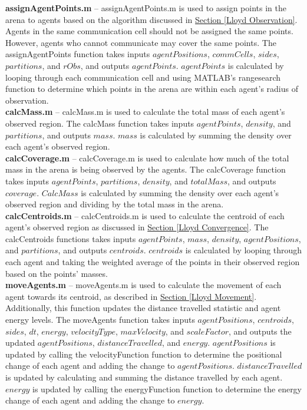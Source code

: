 \documentclass[../CourseManual.tex]{subfiles}
\begin{document}
\textbf{assignAgentPoints.m} -- assignAgentPoints.m is used to assign points in the arena to agents based on the algorithm discussed in \hyperref[Lloyd Observation]{Section \ref{Lloyd Observation}}. Agents in the same communication cell should not be assigned the same points. However, agents who cannot communicate may cover the same points. The assignAgentPoints function takes inputs  $agentPositions$, $commCells$, $sides$, $partitions$, and $rObs$, and outputs $agentPoints$. $agentPoints$ is calculated by looping through each communication cell and using MATLAB's rangesearch function to determine which points in the arena are within each agent's radius of observation. \\ 

\textbf{calcMass.m} -- calcMass.m is used to calculate the total mass of each agent's observed region. The calcMass function takes inputs $agentPoints$, $density$, and $partitions$, and outputs $mass$. $mass$ is calculated by summing the density over each agent's observed region. \\

\textbf{calcCoverage.m} -- calcCoverage.m is used to calculate how much of the total mass in the arena is being observed by the agents. The calcCoverage function takes inputs $agentPoints$, $partitions$, $density$, and $totalMass$, and outputs $coverage$. $CalcMass$ is calculated by summing the density over each agent's observed region and dividing by the total mass in the arena. \\

\textbf{calcCentroids.m} -- calcCentroids.m is used to calculate the centroid of each agent's observed region as discussed in \hyperref[Lloyd Convergence]{Section \ref{Lloyd Convergence}}. The calcCentroids functions takes inputs $agentPoints$, $mass$, $density$, $agentPositions$, and $partitions$, and outputs $centroids$. $centroids$ is calculated by looping through each agent and taking the weighted average of the points in their observed region based on the points' masses. \\

\textbf{moveAgents.m} -- moveAgents.m is used to calculate the movement of each agent towards its centroid, as described in \hyperref[Lloyd Movement]{Section \ref{Lloyd Movement}}. Additionally, this function updates the distance travelled statistic and agent energy levels. The moveAgents function takes inputs $agentPositions$, $centroids$, $sides$, $dt$, $energy$, $velocityType$, $maxVelocity$, and $scaleFactor$, and outputs the updated $agentPositions$, $distanceTravelled$, and $energy$. $agentPositions$ is updated by calling the velocityFunction function to determine the positional change of each agent and adding the change to $agentPositions$. $distanceTravelled$ is updated by calculating and summing the distance travelled by each agent. $energy$ is updated by calling the energyFunction function to determine the energy change of each agent and adding the change to $energy$. \\
\end{document}
